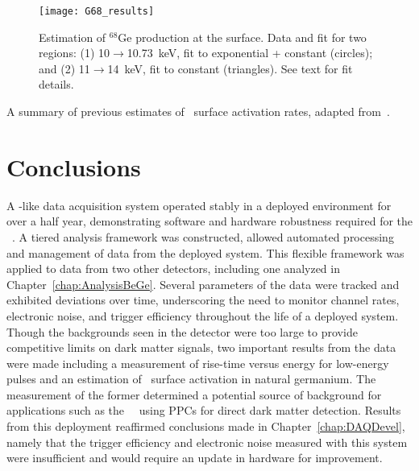 			\begin{figure}
				\centering
				\texttt{[image: G68\_results]}
				\caption{Estimation of $^{68}$Ge production at the surface.  Data and fit for two regions:
				(1) 10$\to$10.73~keV, fit to exponential + constant (circles); and (2) 11$\to$14~keV, fit to constant (triangles).  See text
				for fit details.}
				\label{fig:GE68Production}
			\end{figure}			
			
	          
	          	\begin{table}
				\caption{A summary of previous estimates of \gersixeight~surface activation rates, adapted from~\cite{Elliott:2009cw}.}
				\label{tab:Ge68PreviousResults}
	          	\end{table}			
			
	\section{Conclusions}
	
	A \MJ-like data acquisition system operated stably in a deployed environment for over a half year, demonstrating software and hardware robustness required for the \MJ~\minmod.  A tiered analysis framework was constructed, allowed automated processing and management of data from the deployed system.  This flexible framework was applied to data from two other detectors, including one analyzed in Chapter~\ref{chap:AnalysisBeGe}.  Several parameters of the data were tracked and exhibited deviations over time, underscoring the need to monitor channel rates, electronic noise, and trigger efficiency throughout the life of a deployed system.  Though the backgrounds seen in the detector were too large to provide competitive limits on dark matter signals, two important results from the data were made including a measurement of rise-time versus energy for low-energy pulses and an estimation of \gersixeight~surface activation in natural germanium.  The measurement of the former determined a potential source of background for applications such as the \MJ~\minmod~using PPCs for direct dark matter detection.  Results from this deployment reaffirmed conclusions made in Chapter~\ref{chap:DAQDevel}, namely that the trigger efficiency and electronic noise measured with this system were insufficient and would require an update in hardware for improvement.

